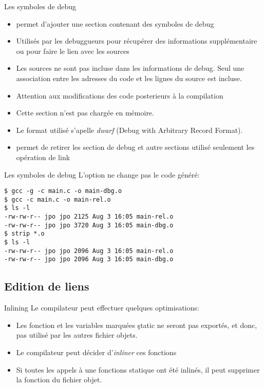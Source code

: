 \begin{frame}[fragile=singleslide]{Les symboles de debug}
  \begin{itemize}
  \item {}  permet d'ajouter une section  contenant des symboles
    de debug
  \item Utilisés  par les debuggueurs pour  récupérer des informations
    supplémentaire ou pour faire le lien avec les sources
  \item  Les sources  ne sont  pas  incluse dans  les informations  de
    debug.  Seul une  association entre  les adresses  du code  et les
    lignes du source est incluse.
  \item  Attention  aux  modifications   des  code  posterieurs  à  la
    compilation
  \item Cette section n'est pas chargée en mémoire.
  \item Le format utilisé s'apelle \emph{dwarf} (Debug with Arbitrary
    Record Format).
  \item {}  permet de retirer  les section de debug  et autre
    sections utilisé seulement les opération de link
  \end{itemize}
\end{frame}

\begin{frame}[fragile=singleslide]{Les symboles de debug}
  L'option  ne change pas le code généré:
  \begin{lstlisting}
$ gcc -g -c main.c -o main-dbg.o
$ gcc -c main.c -o main-rel.o
$ ls -l
-rw-rw-r-- jpo jpo 2125 Aug 3 16:05 main-rel.o
-rw-rw-r-- jpo jpo 3720 Aug 3 16:05 main-dbg.o
$ strip *.o
$ ls -l
-rw-rw-r-- jpo jpo 2096 Aug 3 16:05 main-rel.o
-rw-rw-r-- jpo jpo 2096 Aug 3 16:05 main-dbg.o
  \end{lstlisting}
\end{frame}


\subsection{Edition de liens}

\begin{frame}[fragile=singleslide]{Inlining}
  Le compilateur peut effectuer quelques optimisations:
  \begin{itemize}
  \item Les  fonction et les  variables marquées \c{static}  ne seront
    pas exportés, et donc, pas utilisé par les autres fichier objets.
  \item  Le compilateur peut décider d'\emph{inliner} ces fonctions
  \item Si toutes les appels à une fonctions statique ont été inlinés,
    il peut supprimer la fonction du fichier objet.
  \end{itemize}
\end{frame}


